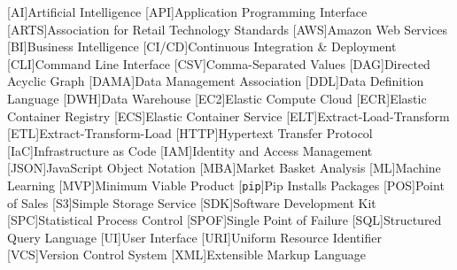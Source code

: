 
\singlespacing
\begin{acronym}[MMMMMM]
	[AI]{Artificial Intelligence}
	[API]{Application Programming Interface}
	[ARTS]{Association for Retail Technology Standards}
	[AWS]{Amazon Web Services}
	[BI]{Business Intelligence}
	[CI/CD]{Continuous Integration \& Deployment}
	[CLI]{Command Line Interface}
	[CSV]{Comma-Separated Values}
	[DAG]{Directed Acyclic Graph}
	[DAMA]{Data Management Association}
	[DDL]{Data Definition Language}
	[DWH]{Data Warehouse}
	[EC2]{Elastic Compute Cloud}
	[ECR]{Elastic Container Registry}
	[ECS]{Elastic Container Service}
	[ELT]{Extract-Load-Transform}
	[ETL]{Extract-Transform-Load}
	[HTTP]{Hypertext Transfer Protocol}
	[IaC]{Infrastructure as Code}
	[IAM]{Identity and Access Management}
	[JSON]{JavaScript Object Notation}
	[MBA]{Market Basket Analysis}
	[ML]{Machine Learning}
	[MVP]{Minimum Viable Product}
	[\texttt{pip}]{Pip Installs Packages}
	[POS]{Point of Sales}
	[S3]{Simple Storage Service}
	[SDK]{Software Development Kit}
	[SPC]{Statistical Process Control}
	[SPOF]{Single Point of Failure}
	[SQL]{Structured Query Language}
	[UI]{User Interface}
	[URI]{Uniform Resource Identifier}
	[VCS]{Version Control System}
	[XML]{Extensible Markup Language}
\end{acronym}
\onehalfspacing